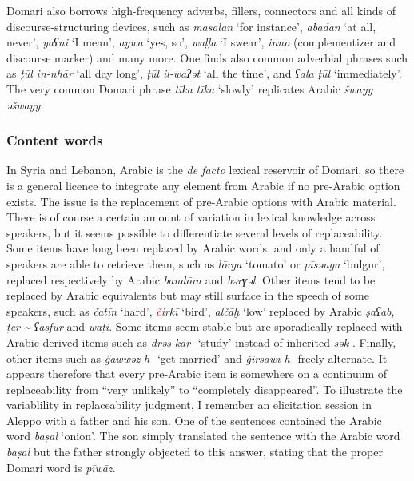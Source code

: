 \documentclass[output=paper]{langsci/langscibook}
\begin{document}
Domari also borrows high-frequency adverbs, fillers, connectors and all kinds of discourse-structuring devices, such as \textit{masalan} ‘for instance’, \textit{abadan} ‘at all, never’, \textit{yaʕni}  ‘I mean’, \textit{aywa} ‘yes, so’, \textit{waḷḷa} ‘I swear’, \textit{inno} (complementizer and discourse marker) and many more. One finds also common adverbial phrases such as \textit{ṭūl} \textit{in-nhār} ‘all day long’, \textit{ṭūl} \textit{il-waʔət} ‘all the time’, and \textit{ʕala} \textit{ṭūl} ‘immediately’.  The very common Domari phrase \textit{tīka} \textit{tīka} ‘slowly’ replicates Arabic \textit{šwayy} \textit{əšwayy}.


 \subsubsection{Content words}

In Syria and Lebanon, Arabic is the \textit{de facto} lexical reservoir of Domari, so there is a general licence to integrate any element from Arabic if no pre-Arabic option exists. The issue is the replacement of pre-Arabic options with Arabic material. There is of course a certain amount of variation in lexical knowledge across speakers, but it seems possible to differentiate several levels of replaceability. Some items have long been replaced by Arabic words, and only a handful of speakers are able to retrieve them, such as \textit{lōrga} ‘tomato’ or \textit{pīsənga} ‘bulgur’, replaced respectively by Arabic \textit{bandōra} and \textit{bərɣəl}. Other items tend to be replaced by Arabic equivalents but may still surface in the speech of some speakers, such as \textit{čatīn} ‘hard’, \textit{\textcolor{red}{č}irkī} ‘bird’, \textit{alčāḫ} ‘low’ replaced by Arabic \textit{ṣaʕab}, \textit{ṭēr} \textit{{\textasciitilde} ʕaṣfūr} and \textit{wāṭi}. Some items seem stable but are sporadically replaced with Arabic-derived items such as \textit{drəs} \textit{kar-} ‘study’ instead of inherited \textit{sək}{}-. Finally, other items  such as \textit{\v{g}awwəz h-} ‘get married’ and \textit{\v{g}irsāwī h-} freely alternate. It appears therefore that every pre-Arabic item is somewhere on a continuum of replaceability from ``very unlikely'' to ``completely disappeared''. To illustrate the variablility in replaceability judgment, I remember an elicitation session in Aleppo with a father and his son. One of the sentences contained the Arabic word \textit{baṣal} ‘onion’. The son simply translated the sentence with the Arabic word \textit{baṣal} but the father strongly objected to this answer, stating that the proper Domari word is \textit{pīwāz}.
\end{document}
